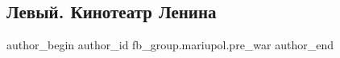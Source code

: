  
 
 
 
 

\subsection{Левый. Кинотеатр Ленина}
\label{sec:27_01_2023.fb.fb_group.mariupol.pre_war.2.levii__kinoteatr_len}

\ifcmt
 author_begin
   author_id fb_group.mariupol.pre_war
 author_end
\fi
